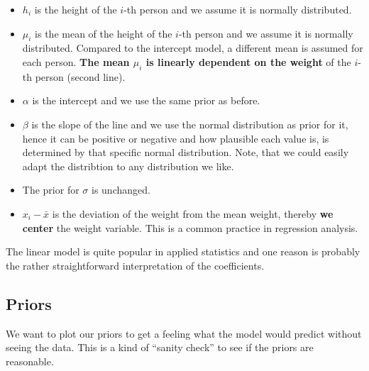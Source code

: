 \documentclass[
]{book}
\providecommand{\tightlist}{%
  \setlength{\itemsep}{0pt}\setlength{\parskip}{0pt}}
\begin{document}
\begin{itemize}
\tightlist
\item
  \(h_i\) is the height of the \(i\)-th person and we assume it is normally distributed.
\item
  \(\mu_i\) is the mean of the height of the \(i\)-th person and we
  assume it is normally distributed. Compared to the intercept model,
  a different mean is assumed for each person. \textbf{The mean \(\mu_i\) is linearly
  dependent on the weight} of the \(i\)-th person (second line).
\item
  \(\alpha\) is the intercept and we use the same prior as before.
\item
  \(\beta\) is the slope of the line and we use the normal distribution as prior for it,
  hence it can be positive or negative and how plausible each value is, is
  determined by that specific normal distribution. Note, that we could
  easily adapt the distribtion to any distribution we like.
\item
  The prior for \(\sigma\) is unchanged.
\item
  \(x_i - \bar{x}\) is the deviation of the weight from the mean weight, thereby \textbf{we
  center} the weight variable. This is a common practice in regression analysis.
\end{itemize}

The linear model is quite popular in applied statistics and one
reason is probably the rather straightforward interpretation of the coefficients.

\subsection{Priors}\label{priors}

We want to plot our priors to get a feeling what
the model would predict without seeing the data.
This is a kind of ``sanity check'' to see if the priors are reasonable.
\end{document}

